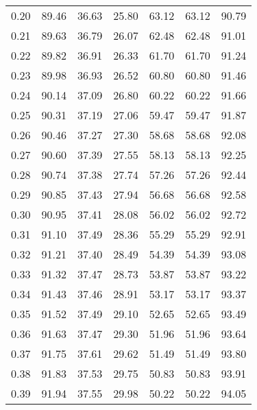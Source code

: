 \begin{tabular}{|c|c|c|c|c|c|c|}
      0.20 &     89.46 &     36.63 &      25.80 &   63.12 &      63.12 &         90.79 \\
      0.21 &     89.63 &     36.79 &      26.07 &   62.48 &      62.48 &         91.01 \\
      0.22 &     89.82 &     36.91 &      26.33 &   61.70 &      61.70 &         91.24 \\
      0.23 &     89.98 &     36.93 &      26.52 &   60.80 &      60.80 &         91.46 \\
      0.24 &     90.14 &     37.09 &      26.80 &   60.22 &      60.22 &         91.66 \\
      0.25 &     90.31 &     37.19 &      27.06 &   59.47 &      59.47 &         91.87 \\
      0.26 &     90.46 &     37.27 &      27.30 &   58.68 &      58.68 &         92.08 \\
      0.27 &     90.60 &     37.39 &      27.55 &   58.13 &      58.13 &         92.25 \\
      0.28 &     90.74 &     37.38 &      27.74 &   57.26 &      57.26 &         92.44 \\
      0.29 &     90.85 &     37.43 &      27.94 &   56.68 &      56.68 &         92.58 \\
      0.30 &     90.95 &     37.41 &      28.08 &   56.02 &      56.02 &         92.72 \\
      0.31 &     91.10 &     37.49 &      28.36 &   55.29 &      55.29 &         92.91 \\
      0.32 &     91.21 &     37.40 &      28.49 &   54.39 &      54.39 &         93.08 \\
      0.33 &     91.32 &     37.47 &      28.73 &   53.87 &      53.87 &         93.22 \\
      0.34 &     91.43 &     37.46 &      28.91 &   53.17 &      53.17 &         93.37 \\
      0.35 &     91.52 &     37.49 &      29.10 &   52.65 &      52.65 &         93.49 \\
      0.36 &     91.63 &     37.47 &      29.30 &   51.96 &      51.96 &         93.64 \\
      0.37 &     91.75 &     37.61 &      29.62 &   51.49 &      51.49 &         93.80 \\
      0.38 &     91.83 &     37.53 &      29.75 &   50.83 &      50.83 &         93.91 \\
      0.39 &     91.94 &     37.55 &      29.98 &   50.22 &      50.22 &         94.05 \\

\end{tabular}
